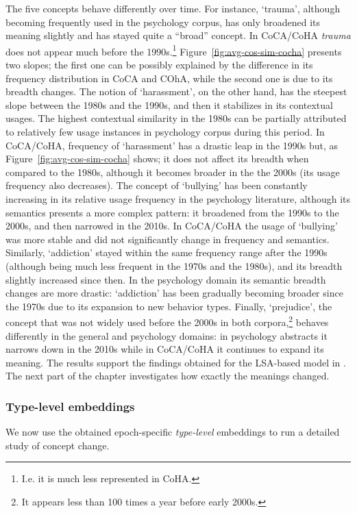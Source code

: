 \documentclass[output=paper]{langsci/langscibook}
\begin{document}
\begin{sloppypar}
 The five concepts behave differently over time. For instance, `trauma', although becoming frequently used in the psychology corpus, has only broadened its meaning slightly and has stayed quite a ``broad'' concept. In CoCA/CoHA \emph{trauma} does not appear much before the 1990s.\footnote{I.e. it is much less represented in CoHA.} Figure~\ref{fig:avg-cos-sim-cocha} presents two slopes; the first one can be possibly explained by the difference in its frequency distribution in CoCA and COhA, while the second one is due to its breadth changes.
The notion of `harassment', on the other hand, has the steepest slope between the 1980s and the 1990s, and then it stabilizes in its contextual usages. The highest contextual similarity in the 1980s can be partially attributed to relatively few usage instances in psychology corpus during this period. In CoCA/CoHA, frequency of `harassment' has a drastic leap in the 1990s but, as Figure~\ref{fig:avg-cos-sim-cocha} shows; it does not affect its breadth when compared to the 1980s, although it becomes broader in the the 2000s (its usage frequency also decreases). The concept of `bullying' has been constantly increasing in its relative usage frequency in the psychology literature, although its semantics presents a more complex pattern: it broadened from the 1990s to the 2000s, and then narrowed in the 2010s. In CoCA/CoHA the usage of `bullying' was more stable and did not significantly change in frequency and semantics. Similarly, `addiction' stayed within the same frequency range after the 1990s (although being much less frequent in the 1970s and the 1980s), and its breadth slightly increased since then. In the psychology domain its semantic breadth changes are more drastic: `addiction' has been gradually becoming broader since the 1970s due to its expansion to new behavior types.  
Finally, `prejudice', the concept that was not widely used before the 2000s in both corpora,\footnote{It appears less than 100 times a year before early 2000s.} behaves differently in the general and psychology domains: in psychology abstracts it narrows down in the 2010s while in CoCA/CoHA it continues to expand its meaning.
The results support the findings obtained for the LSA-based model in \citet{vylomova-etal-2019-evaluation}. The next part of the chapter investigates how exactly the meanings changed.
\end{sloppypar}

\subsubsection{Type-level embeddings}
We now use the obtained epoch-specific \emph{type-level} embeddings to run a detailed study of concept change.
\end{document}
